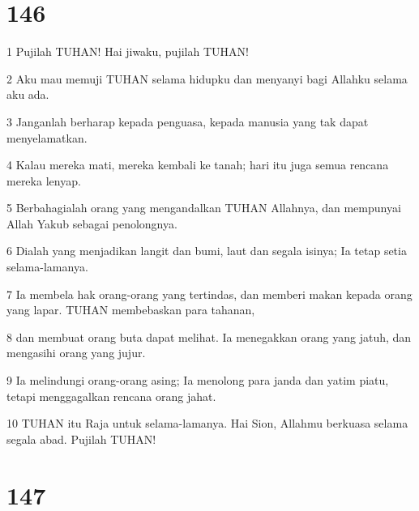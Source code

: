 \chapter{146}

\par 1 Pujilah TUHAN! Hai jiwaku, pujilah TUHAN!
\par 2 Aku mau memuji TUHAN selama hidupku dan menyanyi bagi Allahku selama aku ada.
\par 3 Janganlah berharap kepada penguasa, kepada manusia yang tak dapat menyelamatkan.
\par 4 Kalau mereka mati, mereka kembali ke tanah; hari itu juga semua rencana mereka lenyap.
\par 5 Berbahagialah orang yang mengandalkan TUHAN Allahnya, dan mempunyai Allah Yakub sebagai penolongnya.
\par 6 Dialah yang menjadikan langit dan bumi, laut dan segala isinya; Ia tetap setia selama-lamanya.
\par 7 Ia membela hak orang-orang yang tertindas, dan memberi makan kepada orang yang lapar. TUHAN membebaskan para tahanan,
\par 8 dan membuat orang buta dapat melihat. Ia menegakkan orang yang jatuh, dan mengasihi orang yang jujur.
\par 9 Ia melindungi orang-orang asing; Ia menolong para janda dan yatim piatu, tetapi menggagalkan rencana orang jahat.
\par 10 TUHAN itu Raja untuk selama-lamanya. Hai Sion, Allahmu berkuasa selama segala abad. Pujilah TUHAN!

\chapter{147}

